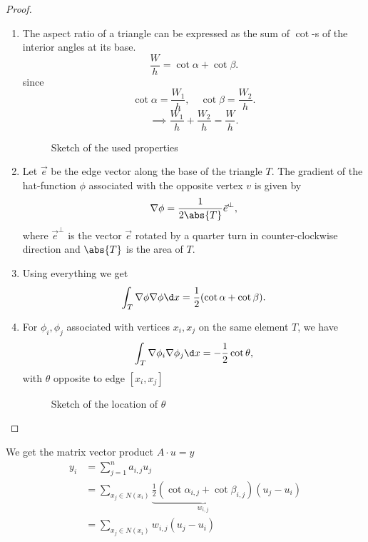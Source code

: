 \begin{proof}
\label{thm:stiffnessmatrixlemmaproof}
\begin{enumerate}[label=\arabic{enumi})]
	\item The aspect ratio of a triangle can be expressed as the sum of $\cot$-s of the interior angles at its base.
		\[
		\frac{W}{h} = \cot \alpha + \cot \beta
		.\] 
		since
		\[
			\cot \alpha = \frac{W_{1}}{h},\quad \cot \beta = \frac{W_2}{h}
		.\] 
		\[
		\implies \frac{W_1}{h} + \frac{W_2}{h} = \frac{W}{h}
		.\] 
		\begin{figure}[H]
			\begin{center}
				
			\end{center}
			\caption{Sketch of the used properties}
			\label{fig:triangleexplained}
		\end{figure}
	\item Let $\vec{e}$ be the edge vector along the base of the triangle $T$. The gradient of the hat-function $\phi$ associated with the opposite vertex $v$ is given by
		\[
		\nabla \phi = \frac{1}{2\abs{T} }\vec{e}^{\bot}
		,\] 
		where $\vec{e}^{\bot}$ is the vector $\vec{e}$ rotated by a quarter turn in counter-clockwise direction and $\abs{T} $ is the area of $T$.
	\item Using everything we get 
		\[
			\int_{T}\nabla \phi \nabla \phi \d x = \frac{1}{2}(\cot \alpha + \cot \beta)
		.\] 
	\item For $\phi _{i}, \phi _{j}$ associated with vertices $x_{i}, x_{j}$ on the same element $T$, we have
		\[
		\int_{T}\nabla  \phi _{i} \nabla \phi _{j} \d x = - \frac{1}{2}\cot \theta
		,\] 
		with $\theta$ opposite to edge $[x_{i}, x_{j}]$
		\begin{figure}[ht!]
			\begin{center}
				
			\end{center}
			\caption{Sketch of the location of $\theta$}
			\label{fig:thetasketch}
		\end{figure}
		
\end{enumerate}
\end{proof}

\begin{remark}
\label{thm:stiffnessmatrixlemmaremark}
	We get the matrix vector product $A\cdot u = y$
	\begin{align*}
		y_{i} &= \sum_{j=1}^{n}{a_{i,j}u_{j}}\\
              &= \sum_{x_{j}\in N(x_{i})}^{}\underbrace{{\frac{1}{2}(\cot \alpha_{i,j}+ \cot \beta_{i,j})}}_{w_{i,j}}(u_{j}-u_{i}) \\
			  &= \sum_{x_{j}\in N(x_{i})}^{}{w_{i,j}(u_{j}- u_{i})}
	\end{align*}
\end{remark}


